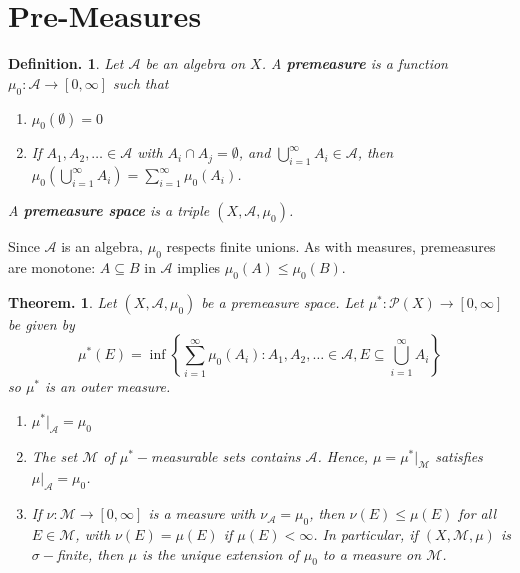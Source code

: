 \documentclass[11pt, a4paper]{memoir}
\theoremstyle{change}
\newtheorem{theorem}{Theorem.}[section]
\theoremstyle{plain}
\theoremstyle{nonumberplain}
\newtheorem{definition}{Definition.}
\begin{document}
\section{Pre-Measures}
\begin{definition}
    Let $\mathcal{A}$ be an algebra on $X$.
    A \textbf{premeasure} is a function $\mu_0:\mathcal{A}\to[0,\infty]$ such that
    \begin{enumerate}[nolistsep,label={(\roman*)}]
        \item $\mu_0(\emptyset)=0$
        \item If $A_1,A_2,\ldots\in\mathcal{A}$ with $A_i\cap A_j=\emptyset$, and $\bigcup_{i=1}^\infty A_i\in \mathcal{A}$, then $\mu_0(\bigcup_{i=1}^\infty A_i)=\sum_{i=1}^\infty \mu_0(A_i)$.
    \end{enumerate}
    A \textbf{premeasure space} is a triple $(X,\mathcal{A},\mu_0)$.
\end{definition}
Since $\mathcal{A}$ is an algebra, $\mu_0$ respects finite unions.
As with measures, premeasures are monotone: $A\subseteq B$ in $\mathcal{A}$ implies $\mu_0(A)\leq\mu_0(B)$.
\begin{theorem}
    Let $(X,\mathcal{A},\mu_0)$ be a premeasure space.
    Let $\mu^*:\mathcal{P}(X)\to[0,\infty]$ be given by
    \begin{equation*}
        \mu^*(E)=\inf\left\{\sum\limits_{i=1}^\infty \mu_0(A_i):A_1,A_2,\ldots\in\mathcal{A},E\subseteq\bigcup_{i=1}^\infty A_i\right\}
    \end{equation*}
    so $\mu^*$ is an outer measure.
    \begin{enumerate}[nolistsep,label=(\roman*)]
        \item $\mu^*|_{\mathcal{A}}=\mu_0$
        \item The set $\mathcal{M}$ of $\mu^*-$measurable sets contains $\mathcal{A}$.
            Hence, $\mu=\mu^*|_{\mathcal{M}}$ satisfies $\mu|_{\mathcal{A}}=\mu_0$.
        \item If $\nu:\mathcal{M}\to[0,\infty]$ is a measure with $\nu_{\mathcal{A}}=\mu_0$, then $\nu(E)\leq\mu(E)$ for all $E\in\mathcal{M}$, with $\nu(E)=\mu(E)$ if $\mu(E)<\infty$.
            In particular, if $(X,\mathcal{M},\mu)$ is $\sigma-$finite, then $\mu$ is the unique extension of $\mu_0$ to a measure on $\mathcal{M}$.
    \end{enumerate}
\end{theorem}
\end{document}
